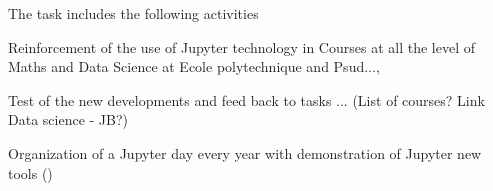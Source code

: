 \begin{task}[
  title=Teaching with Jupyter technology,
  id=teaching,
  lead=EP,
  PM=8, %
  wphases={0-48},
  partners={EP,UPSUD}
  ]
  The task includes the following activities
  \begin{compactitem}
  \item Reinforcement of the use of Jupyter technology in Courses at all the level of Maths and Data Science at Ecole polytechnique and Psud...,
  \item Test of the new developments and feed back to tasks ... (List of courses? Link Data science - JB?)
  \item Organization of a Jupyter day every year with demonstration of Jupyter new tools
    ()
  \end{compactitem}
\end{task}

